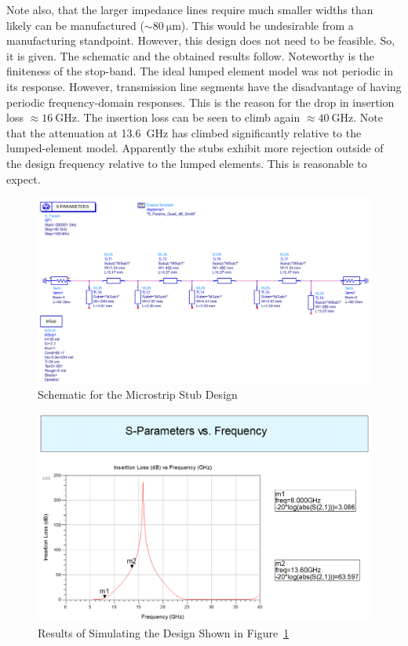    Note also, that the larger impedance lines require much smaller widths than
    likely can be manufactured ($\sim \SI{80}{\micro\meter} $). This would be
    undesirable from a manufacturing standpoint. However, this design does not
    need to be feasible. So, it is given. The schematic and the obtained results
    follow. Noteworthy is the finiteness of the stop-band. The ideal lumped
    element model was not periodic in its response. However, transmission line
    segments have the disadvantage of having periodic frequency-domain
    responses. This is the reason for the drop in insertion loss $\approx 
    \SI{16}{\giga\hertz}$. The insertion loss can be seen to climb again
    $\approx \SI{40}{\giga\hertz}$. Note that the attenuation at
    \SI{13.6}{\giga\hertz} has climbed significantly relative to the
    lumped-element model. Apparently the stubs exhibit more rejection outside of
    the design frequency relative to the lumped elements. This is reasonable to
    expect.

    \begin{figure}[H]
        \centering
        \includegraphics[width=0.8\linewidth]{img/Problem1/MicrostripStubsSchematic.PNG}
        \caption{Schematic for the Microstrip Stub Design}
        \label{fig:img/Problem1/MicrostripStubsSchematic}
    \end{figure}


    \begin{figure}[H]
        \centering
        \includegraphics[width=0.8\linewidth]{img/Problem1/MicroStripStubsResults.PNG}
        \caption{Results of Simulating the Design Shown in
        Figure~\ref{fig:img/Problem1/MicrostripStubsSchematic}}
        \label{fig:img/Problem1/MicroStripStubsResults}
    \end{figure}

